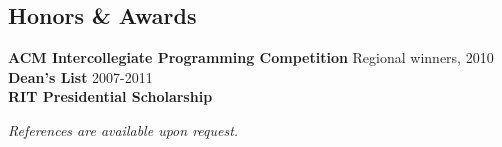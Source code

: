 \documentclass[line,margin]{res}
\begin{document}
\begin{resume}
\section{\sc Honors \& Awards}          
    \textbf{ACM Intercollegiate Programming Competition} \hfill Regional winners, 2010              \\
    \textbf{Dean's List} \hfill                                              2007-2011              \\
    \textbf{RIT Presidential Scholarship}                                                           

\end{resume}

\vfill
\hfill \textit{\small References are available upon request.}
\end{document}
